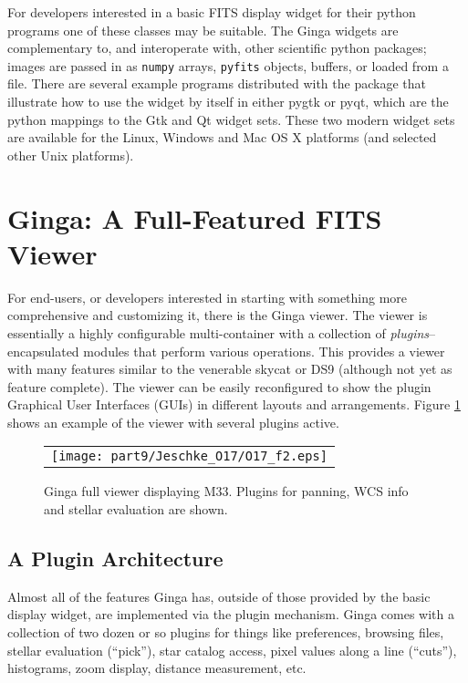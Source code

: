 For developers interested in a basic FITS display widget for their python programs one of these classes may be suitable. The Ginga widgets are complementary to, and interoperate with, other scientific python packages; images are passed in as {\tt numpy} arrays, {\tt pyfits} objects, buffers, or loaded from a file. There are several example programs distributed with the package that illustrate how to use the widget by itself in either pygtk or pyqt, which are the python mappings to the Gtk and Qt widget sets. These two modern widget sets are available for the Linux, Windows and Mac OS X platforms (and selected other Unix platforms).

\section{Ginga: A Full-Featured FITS Viewer}
For end-users, or developers interested in starting with something more comprehensive and customizing it, there is the Ginga viewer.  The viewer is essentially a highly configurable multi-container with a collection of \emph{plugins}--encapsulated modules that perform various operations. This provides a viewer with many features similar to the venerable skycat \citep{skycat} or DS9 (although not yet as feature complete). The viewer can be easily reconfigured to show the plugin Graphical User Interfaces (GUIs) in different layouts and arrangements. Figure \ref{fig:ginga} shows an example of the viewer with several plugins active. 
\begin{figure}
  \begin{center}
    \begin{tabular}{c}
      \texttt{[image: part9/Jeschke\_O17/O17\_f2.eps]}
    \end{tabular}
  \end{center}
  \caption[example] 
          { \label{fig:ginga} 
            Ginga full viewer displaying M33. Plugins for panning, WCS info and stellar evaluation are shown.} 
\end{figure} 

\subsection{A Plugin Architecture}
Almost all of the features Ginga has, outside of those provided by the basic display widget, are implemented via the plugin mechanism. Ginga comes with a collection of two dozen or so plugins for things like preferences, browsing files, stellar evaluation (``pick''), star catalog access, pixel values along a line (``cuts''), histograms, zoom display, distance measurement, etc.

